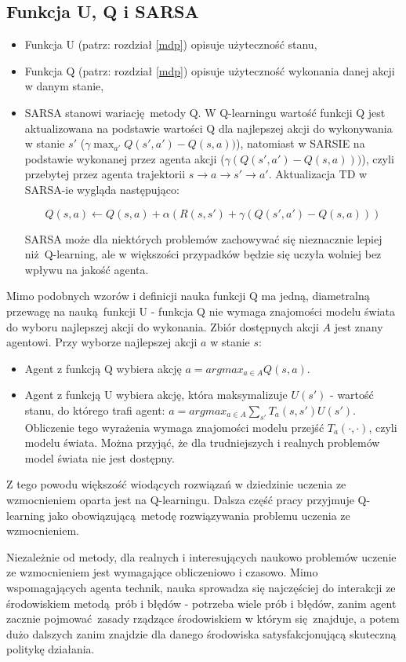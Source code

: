 \subsection{Funkcja U, Q i SARSA}\label{qlearning}
\begin{itemize}
\item Funkcja U (patrz: rozdział \ref{mdp}) opisuje użyteczność stanu,
\item Funkcja Q (patrz: rozdział \ref{mdp}) opisuje użyteczność wykonania danej akcji w danym stanie,
\item SARSA stanowi wariację metody Q. W Q-learningu wartość funkcji Q jest aktualizowana na podstawie wartości Q dla najlepszej akcji do wykonywania w stanie $s'$ ($\gamma \max_{a'}Q(s',a') - Q (s,a))$), natomiast w SARSIE na podstawie wykonanej przez agenta akcji ($\gamma (Q(s',a') - Q (s,a)))$), czyli przebytej przez agenta trajektorii $ s \rightarrow a \rightarrow s' \rightarrow a'$. Aktualizacja TD w SARSA-ie wygląda następująco:

$$Q(s,a) \leftarrow Q(s,a) + \alpha (R(s,s') + \gamma (Q(s',a') - Q (s,a)))$$

SARSA może dla niektórych problemów zachowywać się nieznacznie lepiej niż Q-learning, ale w większości przypadków będzie się uczyła wolniej bez wpływu na jakość agenta.
\end{itemize}

Mimo podobnych wzorów i definicji nauka funkcji Q ma jedną, diametralną przewagę na nauką funkcji U - funkcja Q nie wymaga znajomości modelu świata do wyboru najlepszej akcji do wykonania. Zbiór dostępnych akcji $A$ jest znany agentowi. Przy wyborze najlepszej akcji $a$ w stanie $s$:
\begin{itemize}
\item Agent z funkcją Q wybiera akcję $a = argmax_{a \in A} Q(s,a)$.

\item Agent z funkcją U wybiera akcję, która maksymalizuje $U(s')$ - wartość stanu, do którego trafi agent: $a = argmax_{a \in A} \sum_{s'} T_a(s,s')U(s')$. Obliczenie tego wyrażenia wymaga znajomości modelu przejść $T_a(\cdot, \cdot)$, czyli modelu świata. Można przyjąć, że dla trudniejszych i realnych problemów model świata nie jest dostępny.
\end{itemize}

Z tego powodu większość wiodących rozwiązań w dziedzinie uczenia ze wzmocnieniem oparta jest na Q-learningu.  Dalsza część pracy przyjmuje Q-learning jako obowiązującą metodę rozwiązywania problemu uczenia ze wzmocnieniem.

Niezależnie od metody, dla realnych i interesujących naukowo problemów uczenie ze wzmocnieniem jest wymagające obliczeniowo i czasowo. Mimo wspomagających agenta technik, nauka sprowadza się najczęściej do interakcji ze środowiskiem metodą prób i błędów - potrzeba wiele prób i błędów, zanim agent zacznie pojmować zasady rządzące środowiskiem w którym się znajduje, a potem dużo dalszych zanim znajdzie dla danego środowiska satysfakcjonującą skuteczną politykę działania.

